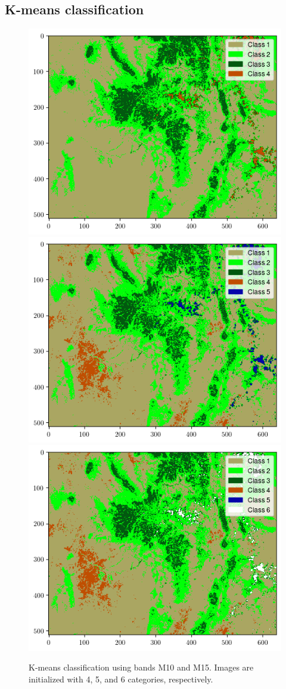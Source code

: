 \documentclass[12pt]{article}
\begin{document}
\clearpage

\subsection{K-means classification}

\begin{figure}[h!]
    \centering
    \includegraphics[width=.48\linewidth]{figures/p6/k-means_M10+M15_4cat.png}
    \includegraphics[width=.48\linewidth]{figures/p6/k-means_M10+M15_5cat.png}
    \includegraphics[width=.48\linewidth]{figures/p6/k-means_M10+M15_6cat.png}
    \caption{K-means classification using bands M10 and M15. Images are initialized with 4, 5, and 6 categories, respectively.}
    \label{p6_456_classes}
\end{figure}
\end{document}

